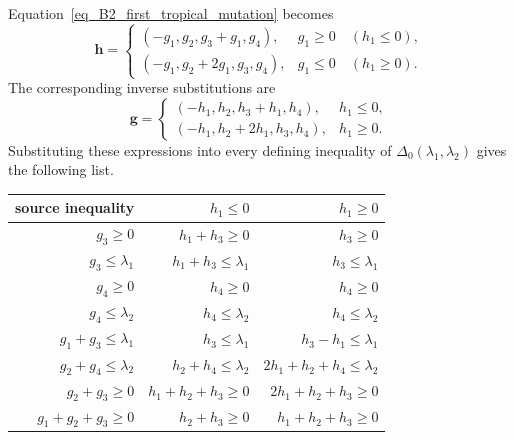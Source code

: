 \documentclass[10pt]{amsart}
\numberwithin{equation}{section}
\theoremstyle{plain}
\theoremstyle{definition}
\theoremstyle{remark}
\begin{document}
Equation~\eqref{eq_B2_first_tropical_mutation} becomes
\[
\mathbf h=
\begin{cases}
	(-g_1,g_2,g_3+g_1,g_4),&g_1\geq0\quad(h_1\leq0),\\
	(-g_1,g_2+2g_1,g_3,g_4),&g_1\leq0\quad(h_1\geq0).
\end{cases}
\]
The corresponding inverse substitutions are
\[
\mathbf g=
\begin{cases}
	(-h_1,h_2,h_3+h_1,h_4),&h_1\leq0,\\
	(-h_1,h_2+2h_1,h_3,h_4),&h_1\geq0.
\end{cases}
\]
Substituting these expressions into every defining inequality of
$\Delta_0(\lambda_1, \lambda_2)$ gives the following list. 
\begin{center}
\begin{tabular}{r|rr}
	source inequality & $h_1\leq0 $& $h_1\geq0 $\\ \midrule 
	$g_3\geq0$ & $h_1+h_3\geq0$ & $h_3\geq0$\\
	$g_3\leq \lambda_1$ & $h_1+h_3\leq \lambda_1$ & $h_3\leq \lambda_1$ \\
	$g_4\geq0$ & $h_4\geq0$ & $h_4\geq0$ \\
	$g_4\leq \lambda_2$ & $h_4\leq \lambda_2$ & $h_4\leq \lambda_2$ \\
	$g_1+g_3\leq \lambda_1$ & $h_3\leq \lambda_1$ & $h_3-h_1\leq \lambda_1$ \\
	$g_2+g_4\leq \lambda_2$ & $h_2+h_4\leq \lambda_2$ & $2h_1+h_2+h_4\leq \lambda_2$ \\
	$g_2+g_3\geq0$ & $h_1+h_2+h_3\geq0$ & $2h_1+h_2+h_3\geq0$ \\
	$g_1+g_2+g_3\geq0$ & $h_2+h_3\geq0$ & $h_1+h_2+h_3\geq0$ 
\end{tabular}
\end{center}
\end{document}
